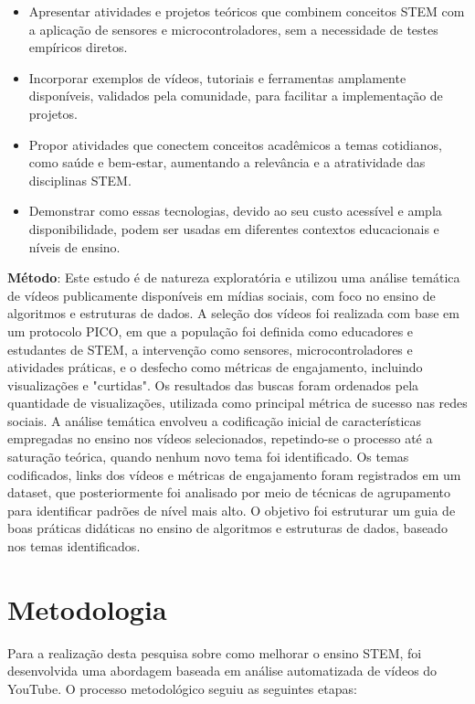 \documentclass[manuscript,screen,review]{acmart}
\begin{document}
\begin{itemize}
    \item Apresentar atividades e projetos teóricos que combinem conceitos STEM com a aplicação de sensores e microcontroladores, sem a necessidade de testes empíricos diretos.
    \item  Incorporar exemplos de vídeos, tutoriais e ferramentas amplamente disponíveis, validados pela comunidade, para facilitar a implementação de projetos.
    \item  Propor atividades que conectem conceitos acadêmicos a temas cotidianos, como saúde e bem-estar, aumentando a relevância e a atratividade das disciplinas STEM.
    \item  Demonstrar como essas tecnologias, devido ao seu custo acessível e ampla disponibilidade, podem ser usadas em diferentes contextos educacionais e níveis de ensino.
\end{itemize}

\textbf{Método}: Este estudo é de natureza exploratória e utilizou uma análise temática de vídeos publicamente disponíveis em mídias sociais, com foco no ensino de algoritmos e estruturas de dados. A seleção dos vídeos foi realizada com base em um protocolo PICO, em que a população foi definida como educadores e estudantes de STEM, a intervenção como sensores, microcontroladores e atividades práticas, e o desfecho como métricas de engajamento, incluindo visualizações e "curtidas". Os resultados das buscas foram ordenados pela quantidade de visualizações, utilizada como principal métrica de sucesso nas redes sociais. A análise temática envolveu a codificação inicial de características empregadas no ensino nos vídeos selecionados, repetindo-se o processo até a saturação teórica, quando nenhum novo tema foi identificado. Os temas codificados, links dos vídeos e métricas de engajamento foram registrados em um dataset, que posteriormente foi analisado por meio de técnicas de agrupamento para identificar padrões de nível mais alto. O objetivo foi estruturar um guia de boas práticas didáticas no ensino de algoritmos e estruturas de dados, baseado nos temas identificados.

\section{Metodologia}

Para a realização desta pesquisa sobre como melhorar o ensino STEM, foi desenvolvida uma abordagem baseada em análise automatizada de vídeos do YouTube. O processo metodológico seguiu as seguintes etapas:
\end{document}

